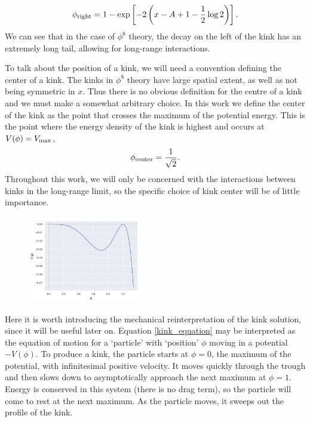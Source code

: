 \documentclass[11pt, oneside]{article}  	%
\numberwithin{equation}{section}
\begin{document}
\begin{equation}
    \phi_{\textup{right}} = 1- \exp\left [ -2\left ( x - A + 1 - \frac{1}{2}\log2 \right ) \right ].
\end{equation}
We can see that in the case of $\phi^8$ theory, the decay on the left of the kink has an extremely long tail, allowing for long-range interactions.\par
To talk about the position of a kink, we will need a convention defining the center of a kink. The kinks in $\phi^8$ theory have large spatial extent, as well as not being symmetric in $x$. Thus there is no obvious definition for the centre of a kink and we must make a somewhat arbitrary choice. In this work we define the center of the kink as the point that crosses the maximum of the potential energy. This is the point where the energy density of the kink is highest and occurs at $V(\phi) = V_{\textup{max}}$,
\begin{align}\label{eqn:kink_center}
    \phi_{\textup{center}} = \frac{1}{\sqrt{2}}.
\end{align}
Throughout this work, we will only be concerned with the interactions between kinks in the long-range limit, so the specific choice of kink center will be of little importance.
\begin{figure}[t]
    \vspace{-10pt}
    \centering
        \includegraphics[width=0.45\textwidth]{mech_kink.png}
     \label{mech}
\end{figure} \par
Here it is worth introducing the mechanical reinterpretation of the kink solution, since it will be useful later on. Equation \ref{kink_equation} may be interpreted as the equation of motion for a `particle' with `position' $\phi$ moving in a potential $-V(\phi)$. To produce a kink, the particle starts at $\phi = 0$, the maximum of the potential, with infinitesimal positive velocity. It moves quickly through the trough and then slows down to asymptotically approach the next maximum at $\phi = 1$. Energy is conserved in this system (there is no drag term), so the particle will come to rest at the next maximum. As the particle moves, it sweeps out the profile of the kink.\par
\end{document}
